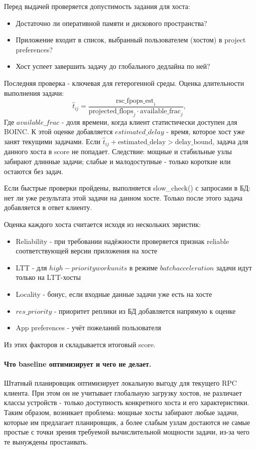 \documentclass[a4paper,12pt]{extarticle}
\begin{document}
Перед выдачей проверяется допустимость задания для хоста:
\begin{itemize}
    \item Достаточно ли оперативной памяти и дискового пространства?
    \item Приложение входит в список, выбранный пользователем (хостом) в project preferences?
    \item Хост успеет завершить задачу до глобального дедлайна по ней?
\end{itemize}
Последняя проверка - ключевая для гетерогенной среды. Оценка длительности выполнения задачи:
\[
    \hat{t}_{ij} = \frac{\text{rsc\_fpops\_est}_i}{\text{projected\_flops}_j \cdot \text{available\_frac}_j},
\]
Где $available\_frac$ - доля времени, когда клиент статистически доступен для BOINC. К этой оценке добавляется $estimated\_delay$ - время, которое хост уже занят текущими задачами. Если $\hat{t}_{ij} + \text{estimated\_delay} > \text{delay\_bound}$, задача для данного хоста в score не попадает. Следствие: мощные и стабильные узлы забирают длинные задачи; слабые и малодоступные - только короткие или остаются без задач.

Если быстрые проверки пройдены, выполняется slow\_check() с запросами в БД: нет ли уже результата этой задачи на данном хосте. Только после этого задача добавляется в ответ клиенту.

Оценка каждого хоста считается исходя из нескольких эвристик:
\begin{itemize}
    \item Reliability - при требовании надёжности проверяется признак reliable соответствующей версии приложения на хосте
    \item LTT - для $high-priority workunits$ в режиме $batch acceleration$ задачи идут только на LTT-хосты
    \item Locality - бонус, если входные данные задачи уже есть на хосте
    \item $res\_priority$ - приоритет реплики из БД добавляется напрямую к оценке
    \item App preferences - учёт пожеланий пользователя
\end{itemize}
Из этих факторов и складывается итоговый score.

\paragraph{Что baseline оптимизирует и чего не делает.}
Штатный планировщик оптимизирует локальную выгоду для текущего RPC клиента. При этом он не учитывает глобальную загрузку хостов, не различает классы устройств - только доступность конкретного хоста и его характеристики. Таким образом, возникает проблема: мощные хосты забирают любые задачи, которые им предлагает планировщик, а более слабым узлам достаются не самые простые с точки зрения требуемой вычислительной мощности задачи, из-за чего те вынуждены простаивать.
\end{document}
